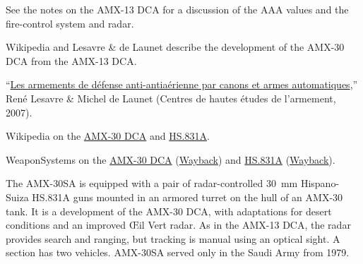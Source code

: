 \begin{withcounters}
{        See the notes on the AMX-13 DCA for a discussion of the AAA values and the fire-control system and radar.

        Wikipedia and Lesavre \& de Launet describe the development of the AMX-30 DCA from the AMX-13 DCA.

        \begin{notesources}
            \item “\href{https://www.yumpu.com/fr/document/view/16630048/les-armements-de-defense-antiaerienne-souvenirs-de-la-}{\foreignlanguage{french}{Les armements de défense anti-antiaérienne par canons et armes automatiques}},” René Lesavre \& Michel de Launet (\foreignlanguage{french}{Centres de hautes études de l'armement}, 2007).
            \item Wikipedia on the \href{https://en.wikipedia.org/wiki/AMX-30\#AMX-30_DCA_–_défense_contre_avion}{AMX-30 DCA} and \href{https://en.wikipedia.org/wiki/Oerlikon_KCB}{HS.831A}.
            \item WeaponSystems on the \href{https://weaponsystems.net/system/114-AMX-30\%20DCA}{AMX-30 DCA} (\href{https://web.archive.org/web/20260626051319/https://weaponsystems.net/system/114-AMX-30\%20DCA}{Wayback}) and \href{https://weaponsystems.net/system/1562-30mm\%20Hispano-Suiza\%20HS.831}{HS.831A} (\href{https://web.archive.org/web/20260624132150/https://weaponsystems.net/system/1562-30mm\%20Hispano-Suiza\%20HS.831}{Wayback}).
        \end{notesources}
    }


    The AMX-30SA is equipped with a pair of radar-controlled 30~mm Hispano-Suiza HS.831A guns mounted in an armored turret on the hull of an AMX-30 tank.
    It is a development of the AMX-30 DCA, with adaptations for desert conditions and an improved \foreignlanguage{french}{Œil Vert} radar.
    As in the AMX-13 DCA, the radar provides search and ranging, but tracking is manual using an optical sight.
    A section has two vehicles.
    AMX-30SA served only in the Saudi Army from 1979.%
\end{withcounters}
